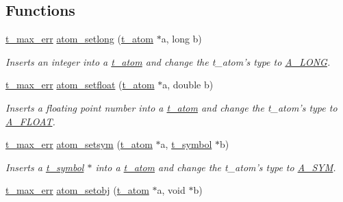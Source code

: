 \subsection*{Functions}
\begin{DoxyCompactItemize}
\item 
\hyperlink{group__datatypes_ga73edaae82b318855cc09fac994918165}{t\_\-max\_\-err} \hyperlink{group__atom_ga98af493b18dfac0f8d441e16e520d5f6}{atom\_\-setlong} (\hyperlink{structt__atom}{t\_\-atom} $\ast$a, long b)
\begin{DoxyCompactList}\small\item\em Inserts an integer into a \hyperlink{structt__atom}{t\_\-atom} and change the t\_\-atom's type to \hyperlink{group__atom_gga8aa6700e9f00b132eb376db6e39ade47a002f28879581a6f66ea492b994b96f1e}{A\_\-LONG}. \item\end{DoxyCompactList}\item 
\hyperlink{group__datatypes_ga73edaae82b318855cc09fac994918165}{t\_\-max\_\-err} \hyperlink{group__atom_gae4faf28f99370e1a4ae9eab7df5bede7}{atom\_\-setfloat} (\hyperlink{structt__atom}{t\_\-atom} $\ast$a, double b)
\begin{DoxyCompactList}\small\item\em Inserts a floating point number into a \hyperlink{structt__atom}{t\_\-atom} and change the t\_\-atom's type to \hyperlink{group__atom_gga8aa6700e9f00b132eb376db6e39ade47a0b3aa0ab8104573dfc9cb70b5b08031f}{A\_\-FLOAT}. \item\end{DoxyCompactList}\item 
\hyperlink{group__datatypes_ga73edaae82b318855cc09fac994918165}{t\_\-max\_\-err} \hyperlink{group__atom_ga36c2619378802011ff0ff44bf74a807c}{atom\_\-setsym} (\hyperlink{structt__atom}{t\_\-atom} $\ast$a, \hyperlink{structt__symbol}{t\_\-symbol} $\ast$b)
\begin{DoxyCompactList}\small\item\em Inserts a \hyperlink{structt__symbol}{t\_\-symbol} $\ast$ into a \hyperlink{structt__atom}{t\_\-atom} and change the t\_\-atom's type to \hyperlink{group__atom_gga8aa6700e9f00b132eb376db6e39ade47a2d661c2a5d949566e2f1944c99bceeea}{A\_\-SYM}. \item\end{DoxyCompactList}\item 
\hyperlink{group__datatypes_ga73edaae82b318855cc09fac994918165}{t\_\-max\_\-err} \hyperlink{group__atom_ga0ad7d5c696047effee6b6bbf04a981c4}{atom\_\-setobj} (\hyperlink{structt__atom}{t\_\-atom} $\ast$a, void $\ast$b)

\end{DoxyCompactItemize}
